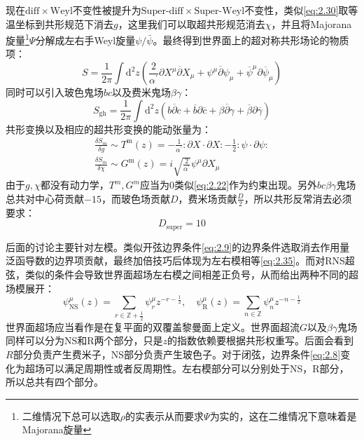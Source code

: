 现在$\mathrm{diff}\times\mathrm{Weyl}$不变性被提升为$\mathrm{Super\mbox{-}diff}\times\mathrm{Super\mbox{-}Weyl}$不变性，类似\ref{eq:2.30}取等温坐标到共形规范下消去$g$，这里我们可以取超共形规范消去$\chi$，并且将Majorana旋量\footnote{二维情况下总可以选取$\rho$的实表示从而要求$\Psi$为实的，这在二维情况下意味着是Majorana旋量}$\Psi$分解成左右手Weyl旋量$\psi/\bar\psi$。最终得到世界面上的超对称共形场论的物质项：
\begin{equation}
	S=\frac{1}{2\pi}\int\mathrm{d}^2z\left(\frac{2}{\alpha^{\prime}}\partial X^\mu\overline{\partial}X_\mu+\psi^\mu\overline{\partial}\psi_\mu+\overline{\psi}^\mu\partial\overline{\psi}_\mu\right)
\end{equation}
同时可以引入玻色鬼场$bc$以及费米鬼场$\beta\gamma$：
\begin{equation}
	S_{\mathrm{gh}}=\frac{1}{2\pi}\int\mathrm{d}^2z\left(b\overline{\partial}c+\overline{b}\partial\overline{c}+\beta\overline{\partial}\gamma+\overline{\beta}\partial\overline{\gamma}\right)
\end{equation}
共形变换以及相应的超共形变换的能动张量为：
\begin{equation}
	\label{eq:3.4}
	\begin{gathered}
		\frac{\delta S_m}{\delta g}\sim T^\mathrm{m}(z)=-\frac{1}{\alpha^{\prime}}:\partial X\cdot\partial X:-\frac{1}{2}:\psi\cdot\partial\psi:\\
		\frac{\delta S_m}{\delta\chi}\sim G^\mathrm{m}(z)=i\sqrt{\frac{2}{\alpha^{\prime}}}\psi^\mu\partial X_\mu
	\end{gathered}
\end{equation}
由于$g,\chi$都没有动力学，$T^m,G^m$应当为$0$类似\ref{eq:2.22}作为约束出现。另外$bc\beta\gamma$鬼场总共对中心荷贡献$-15$，而玻色场贡献$D$，费米场贡献$\frac{D}{2}$，所以共形反常消去必须要求：
\begin{equation}
	\boxed{D_{\mathrm{super}}=10}
\end{equation}

后面的讨论主要针对左模。类似开弦边界条件\ref{eq:2.9}的边界条件选取消去作用量泛函导数的边界项贡献，最终加倍技巧后体现为左右模相等\ref{eq:2.35}。而对RNS超弦，类似的条件会导致世界面超场左右模之间相差正负号，从而给出两种不同的超场模展开：
\begin{equation}
	\psi_{\mathrm{NS}}^\mu(z)=\sum_{r\in\mathbb{Z}+\frac{1}{2}}\psi_r^\mu z^{-r-\frac{1}{2}},\quad\psi_{\mathrm{R}}^\mu(z)=\sum_{n\in\mathbb{Z}}\psi_n^\mu z^{-n-\frac{1}{2}}
\end{equation}
世界面超场应当看作是在复平面的双覆盖黎曼面上定义。世界面超流$G$以及$\beta\gamma$鬼场同样可以分为NS和R两个部分，只是$z$的指数依赖要根据共形权重写。后面会看到$R$部分负责产生费米子，NS部分负责产生玻色子。对于闭弦，边界条件\ref{eq:2.8}变化为超场可以满足周期性或者反周期性。左右模部分可以分别处于NS，R部分，所以总共有四个部分。

